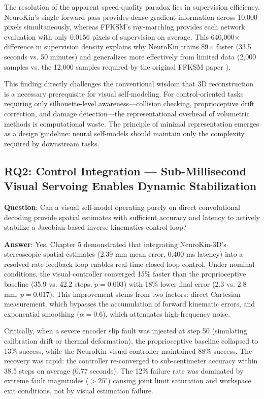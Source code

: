 \documentclass[12pt,a4paper,oneside]{report}
\begin{document}
The resolution of the apparent speed-quality paradox lies in supervision efficiency. NeuroKin's single forward pass provides dense gradient information across 10,000 pixels simultaneously, whereas FFKSM's ray-marching provides each network evaluation with only 0.0156 pixels of supervision on average. This 640,000$\times$ difference in supervision density explains why NeuroKin trains 89$\times$ faster (33.5 seconds vs. 50 minutes) and generalizes more effectively from limited data (2,000 samples vs. the 12,000 samples required by the original FFKSM paper \cite{hu2024teaching}).

This finding directly challenges the conventional wisdom that 3D reconstruction is a necessary prerequisite for visual self-modeling. For control-oriented tasks requiring only silhouette-level awareness---collision checking, proprioceptive drift correction, and damage detection---the representational overhead of volumetric methods is computational waste. The principle of minimal representation emerges as a design guideline: neural self-models should maintain only the complexity required by downstream tasks.

\subsection{RQ2: Control Integration --- Sub-Millisecond Visual Servoing Enables Dynamic Stabilization}

\textbf{Question}: Can a visual self-model operating purely on direct convolutional decoding provide spatial estimates with sufficient accuracy and latency to actively stabilize a Jacobian-based inverse kinematics control loop?

\textbf{Answer}: Yes. Chapter 5 demonstrated that integrating NeuroKin-3D's stereoscopic spatial estimates (2.39 mm mean error, 0.400 ms latency) into a resolved-rate feedback loop enables real-time closed-loop control. Under nominal conditions, the visual controller converged 15\% faster than the proprioceptive baseline (35.9 vs. 42.2 steps, $p = 0.003$) with 18\% lower final error (2.3 vs. 2.8 mm, $p = 0.017$). This improvement stems from two factors: direct Cartesian measurement, which bypasses the accumulation of forward kinematic errors, and exponential smoothing ($\alpha = 0.6$), which attenuates high-frequency noise.

Critically, when a severe encoder slip fault was injected at step 50 (simulating calibration drift or thermal deformation), the proprioceptive baseline collapsed to 13\% success, while the NeuroKin visual controller maintained 88\% success. The recovery was rapid: the controller re-converged to sub-centimeter accuracy within 38.5 steps on average (0.77 seconds). The 12\% failure rate was dominated by extreme fault magnitudes ($>25^\circ$) causing joint limit saturation and workspace exit conditions, not by visual estimation failure.
\end{document}
